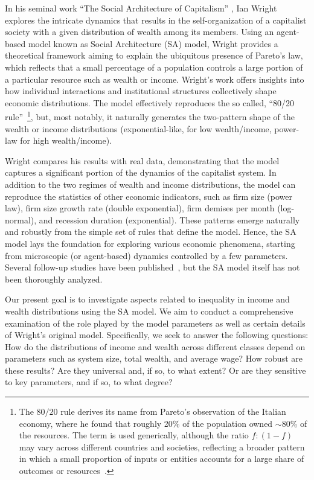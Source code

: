 \documentclass[11pt,a4paper]{revtex4-1}
\begin{document}
In his seminal work ``The Social Architecture of Capitalism'' \cite{WRIGHT2005589},  Ian Wright explores the intricate dynamics that results in the self-organization of a capitalist society with a given distribution of wealth among its members. Using an agent-based model known as Social Architecture (SA) model, Wright provides a theoretical framework aiming to explain the ubiquitous presence of Pareto's law, which reflects that a small percentage of a population controls a large portion of a particular resource such as wealth or income. Wright's work offers insights into how individual interactions and institutional structures collectively shape economic distributions.  
%
The model effectively reproduces the so called, ``80/20 rule''~\footnote{
 The $80/20$ rule derives its name from Pareto's observation of the Italian economy, where he found that roughly 20\% of the population owned $\sim 80$\% of the resources. The term is used generically, although the ratio $f:(1-f)$ may vary across different countries and societies, reflecting a broader pattern in which a small proportion of inputs or entities accounts for a large share of outcomes or resources~\cite{boghosian2014,boghosian2014a}.}, but, most notably, it naturally generates the two-pattern shape of the wealth or income distributions (exponential-like, for low wealth/income, power-law for high wealth/income). 

Wright compares his results with real data, demonstrating that the model captures a significant portion of the dynamics of the capitalist system. 
In addition to the two regimes of wealth and income distributions, the model can reproduce the statistics of other economic indicators, such as
firm size (power law), firm size growth rate (double exponential), firm demises per month (log-normal), and recession duration (exponential). These patterns emerge naturally and robustly from the simple set of rules that define the model. 
%
Hence, the SA model lays the foundation for exploring various economic phenomena, starting from microscopic (or agent-based) dynamics controlled by a few parameters. Several follow-up studies have been published~\cite{Cottrell2009,WRIGHT2010,LAVICKA2010,ISAAC2019,VILLA2022,MAX2024}, but the SA model itself has not been thoroughly analyzed.
 

Our present goal is to investigate aspects related to inequality in income and wealth distributions using the SA model. We aim to conduct a comprehensive examination of the role played by the model parameters as well as certain details of Wright's original model. Specifically, we seek to answer the following questions: How do the distributions of income and wealth across different classes depend on parameters such as system size, total wealth, and average wage? How robust are these results? Are they universal and, if so, to what extent? Or are they sensitive to key parameters, and if so, to what degree?
\end{document}
